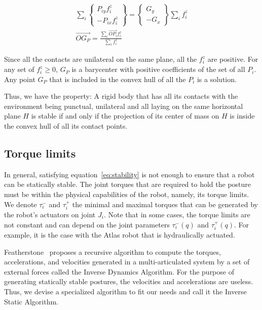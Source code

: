 \begin{align}
\sum\limits_i \left\{\begin{array}{r} P_{iy}f_i^z\\-P_{ix}f_i^z\end{array}\right\}
= \left\{\begin{array}{r} G_{y}\\-G_{x}\end{array}\right\} \sum\limits_i f_i^z\\
  \overrightarrow{OG_P} = \frac{\sum\limits_i \overrightarrow{OP_i} f_i^z}{\sum\limits_i f_i^z}
\end{align}

Since all the contacts are unilateral on the same plane, all the $f_i^z$ are positive.
For any set of $f_i^z\geq0$, $G_P$ is a barycenter with positive coefficients of the set of all $P_i$.
Any point $G_P$ that is included in the convex hull of all the $P_i$ is a solution.

Thus, we have the property: A rigid body that has all its contacts with the environment being punctual, unilateral and all laying on the same horizontal plane $H$ is stable if and only if the projection of its center of mass on $H$ is inside the convex hull of all its contact points.



\subsection{Torque limits}
\label{sub:torque_limits}


In general, satisfying equation~\ref{eq:stability} is not enough to ensure that a robot can be statically stable.
The joint torques that are required to hold the posture must be within the physical capabilities of the robot, namely, its torque limits.
We denote $\tau_i^-$ and $\tau_i^+$ the minimal and maximal torques that can be generated by the robot's actuators on joint $J_i$.
Note that in some cases, the torque limits are not constant and can depend on the joint parameters $\tau_i^-(q)$ and $\tau_i^+(q)$.
For example, it is the case with the Atlas robot that is hydraulically actuated.

Featherstone~\cite{featherstone:book:2007} proposes a recursive algorithm to compute the torques, accelerations, and velocities generated in a multi-articulated system by a set of external forces called the Inverse Dynamics Algorithm.
For the purpose of generating statically stable postures, the velocities and accelerations are useless.
Thus, we devise a specialized algorithm to fit our needs and call it the Inverse Static Algorithm.

